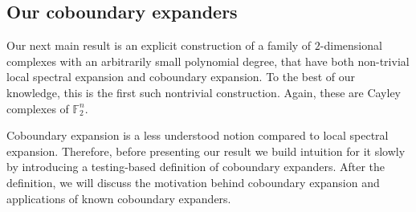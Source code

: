 \documentclass[10pt,a4paper]{article}
\newtheorem{theorem}{Theorem}[section]
\theoremstyle{definition}
\theoremstyle{remark}
\newcommand{\F}{\mathbb{F}}
\let\epsilon=\varepsilon
\numberwithin{equation}{section}
\begin{document}



\subsection{Our coboundary expanders} \label{sec:intro-cob-exp}

Our next main result is an explicit construction of a family of $2$-dimensional complexes with an arbitrarily small polynomial degree, that have both non-trivial local spectral expansion and coboundary expansion. To the best of our knowledge, this is the first such nontrivial construction. Again, these are Cayley complexes of \(\F_2^n\).

Coboundary expansion is a less understood notion compared to local spectral expansion. Therefore, before presenting our result we build intuition for it slowly by introducing a testing-based definition of coboundary expanders. After the definition, we will discuss the motivation behind coboundary expansion and applications of known coboundary expanders.
\end{document}
